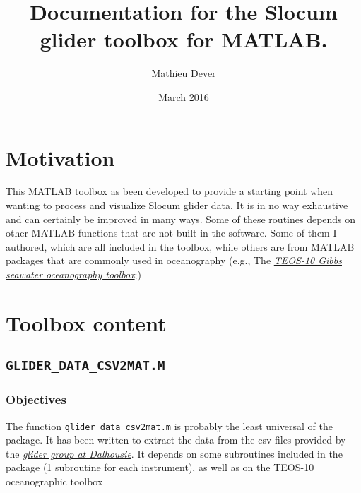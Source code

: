 \documentclass[11pt,A4]{report}
\begin{document}
\title{Documentation for the Slocum glider toolbox for MATLAB.}
\author{Mathieu Dever}
\date{March 2016}
\maketitle

\tableofcontents

\pagebreak

\section{Motivation}

This MATLAB toolbox as been developed to provide a starting point when wanting to process and visualize Slocum glider data. It is in no way exhaustive and can certainly be improved in many ways. Some of these routines depends on other MATLAB functions that are not built-in the software. Some of them I authored, which are all included in the toolbox, while others are from MATLAB packages that are commonly used in oceanography (e.g., The \href{http://www.teos-10.org/}{\it{\color{blue} TEOS-10 Gibbs seawater oceanography toolbox}};\cite{McDougall:2011})

\section{Toolbox content}

\subsection{\texttt{GLIDER\_DATA\_CSV2MAT.M}}

\subsubsection{Objectives}
The function \texttt{glider\_data\_csv2mat.m} is probably the least universal of the package. It has been written to extract the data from the csv files provided by the \href{http://gliders.oceantrack.org/}{\it{\color{blue}glider group at Dalhousie}}. It depends on some subroutines included in the package (1 subroutine for each instrument), as well as on the TEOS-10 oceanographic toolbox \cite{McDougall:2011}
\end{document}
